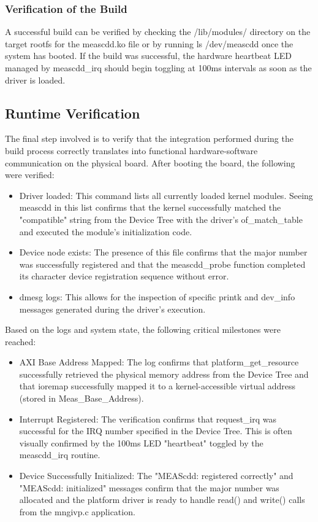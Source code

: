 \subsubsection{Verification of the Build}
A successful build can be verified by checking the /lib/modules/ directory on the target rootfs for the meascdd.ko file or by running ls /dev/meascdd once the system has booted. If the build was successful, the hardware heartbeat LED managed by meascdd\_irq should begin toggling at 100ms intervals as soon as the driver is loaded.

\subsection{Runtime Verification}
The final step involved is to verify that the integration performed during the build process correctly translates into functional hardware-software communication on the physical board.
After booting the board, the following were verified:
\begin{itemize}
\item Driver loaded: This command lists all currently loaded kernel modules. Seeing meascdd in this list confirms that the kernel successfully matched the "compatible" string from the Device Tree with the driver's of\_match\_table and executed the module's initialization code.
\item Device node exists: The presence of this file confirms that the major number was successfully registered and that the meascdd\_probe function completed its character device registration sequence without error.
\item dmesg logs: This allows for the inspection of specific printk and dev\_info messages generated during the driver's execution.
\end{itemize}
Based on the logs and system state, the following critical milestones were reached:
\begin{itemize}
\item AXI Base Address Mapped: The log confirms that platform\_get\_resource successfully retrieved the physical memory address from the Device Tree and that ioremap successfully mapped it to a kernel-accessible virtual address (stored in Meas\_Base\_Address).
\item Interrupt Registered: The verification confirms that request\_irq was successful for the IRQ number specified in the Device Tree. This is often visually confirmed by the 100ms LED "heartbeat" toggled by the meascdd\_irq routine.
\item Device Successfully Initialized: The "MEAScdd: registered correctly" and "MEAScdd: initialized" messages confirm that the major number was allocated and the platform driver is ready to handle read() and write() calls from the mngivp.c application.
\end{itemize}


